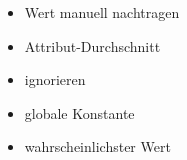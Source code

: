 	\begin{itemize}
		\item Wert manuell nachtragen
		\item Attribut-Durchschnitt
		\item ignorieren
		\item globale Konstante
		\item wahrscheinlichster Wert
	\end{itemize}